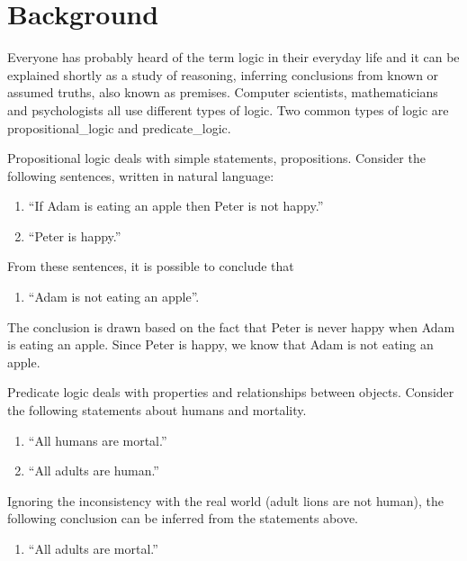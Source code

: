 \section{Background}

Everyone has probably heard of the term logic in their everyday life and it can be explained shortly as a study of reasoning, inferring conclusions from known or assumed truths, also known as premises. Computer scientists, mathematicians and psychologists all use different types of logic. Two common types of logic are \gls{propositional_logic} and \gls{predicate_logic}.

Propositional logic deals with simple statements, propositions. Consider the following sentences, written in natural language:

\begin{enumerate}
      \item ``If Adam is eating an apple then Peter is not happy.''
      \item ``Peter is happy.''
\end{enumerate}

From these sentences, it is possible to conclude that

\begin{enumerate}[resume]
      \item ``Adam is not eating an apple''.
\end{enumerate}

The conclusion is drawn based on the fact that Peter is never happy when Adam is eating an apple. Since Peter is happy, we know that Adam is not eating an apple.

Predicate logic deals with properties and relationships between objects. Consider the following statements about humans and mortality.

\begin{enumerate}[resume]
      \item ``All humans are mortal.''
      \item ``All adults are human.''
\end{enumerate}

Ignoring the inconsistency with the real world (adult lions are not human), the following conclusion can be inferred from the statements above.

\begin{enumerate}[resume]
      \item ``All adults are mortal.''
\end{enumerate}

